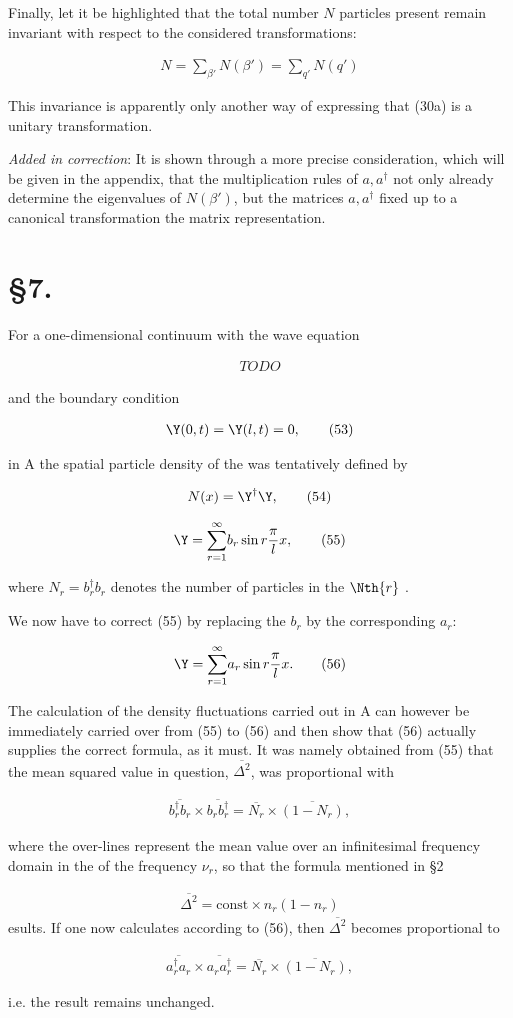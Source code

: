 \documentclass{article}
\newcommand{\nequ}[2]{
\begin{align*}
#1
\tag{#2}
\end{align*}
}
\newcommand{\sumXY}[2]{\underset{#1}{\overset{#2}{\sum}}}
\newcommand{\sumX}[1]{\underset{#1}{\sum}}
\begin{document}
Finally, let it be highlighted that the total number $N$ particles present remain invariant with respect to the considered transformations:
\nequ{
N=\sumX{\beta'}N(\beta') = \sumX{q'}N(q')
}{51}
This invariance is apparently only another way of expressing that (30a) is a unitary transformation.

\textit{Added in correction}: It is shown through a more precise consideration, which will be given in the appendix, that the multiplication rules of $a,a^\dagger$ not only already determine the eigenvalues of $N(\beta')$, but  the matrices $a,a^\dagger$ fixed up to a canonical transformation the matrix representation.

\section*{§7.}
For a one-dimensional continuum with the wave equation
\nequ{TODO}{52}
and the boundary condition
\nequ{
\Y(0,t) = \Y(l,t) = 0,
}{53}
in A the spatial particle density of the  was tentatively defined by
\nequ{
N(x) = \Y^\dagger \Y,
}{54}
\nequ{
\Y=\sumXY{r=1}{\infty}b_r \sin{r \frac{\pi}{l} x},
}{55}
where $N_r=b_r^\dagger b_r$ denotes the number of particles in the $\Nth{r}$ .

We now have to correct (55) by replacing the $b_r$ by the corresponding $a_r$:
\nequ{
\Y=\sumXY{r=1}{\infty}a_r \sin{r \frac{\pi}{l} x}.
}{56}
The calculation of the density fluctuations carried out in A can however be immediately carried over from (55) to (56) and then show that (56) actually supplies the correct formula, as it must. It was namely obtained from (55) that the mean squared value in question, $\overline{\Delta^2}$, was proportional with
\nequ{
\overline{b^\dagger_r b_r}\times\overline{b_r b^\dagger_r} = \overline{N_r}\times\overline{(1-N_r)},
}{57}
where the over-lines represent the mean value over an infinitesimal frequency domain in the  of the frequency $\nu_r$, so that the formula mentioned in §2
\nequ{
\overline{\Delta^2} = \text{const}\times n_r(1-n_r)
}
results. If one now calculates according to (56), then $\overline{\Delta^2}$ becomes proportional to
\nequ{
\overline{a^\dagger_r a_r}\times\overline{a_r a^\dagger_r} = \overline{N_r}\times\overline{(1-N_r)},
}{59}
i.e. the result remains unchanged.
\end{document}
